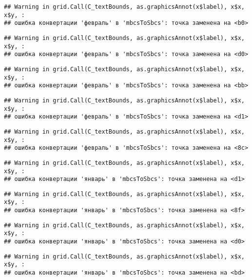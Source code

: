 \documentclass[
]{article}
\begin{document}
\begin{verbatim}
## Warning in grid.Call(C_textBounds, as.graphicsAnnot(x$label), x$x, x$y, :
## ошибка конвертации 'февраль' в 'mbcsToSbcs': точка заменена на <b0>
\end{verbatim}

\begin{verbatim}
## Warning in grid.Call(C_textBounds, as.graphicsAnnot(x$label), x$x, x$y, :
## ошибка конвертации 'февраль' в 'mbcsToSbcs': точка заменена на <d0>
\end{verbatim}

\begin{verbatim}
## Warning in grid.Call(C_textBounds, as.graphicsAnnot(x$label), x$x, x$y, :
## ошибка конвертации 'февраль' в 'mbcsToSbcs': точка заменена на <bb>
\end{verbatim}

\begin{verbatim}
## Warning in grid.Call(C_textBounds, as.graphicsAnnot(x$label), x$x, x$y, :
## ошибка конвертации 'февраль' в 'mbcsToSbcs': точка заменена на <d1>
\end{verbatim}

\begin{verbatim}
## Warning in grid.Call(C_textBounds, as.graphicsAnnot(x$label), x$x, x$y, :
## ошибка конвертации 'февраль' в 'mbcsToSbcs': точка заменена на <8c>
\end{verbatim}

\begin{verbatim}
## Warning in grid.Call(C_textBounds, as.graphicsAnnot(x$label), x$x, x$y, :
## ошибка конвертации 'январь' в 'mbcsToSbcs': точка заменена на <d1>
\end{verbatim}

\begin{verbatim}
## Warning in grid.Call(C_textBounds, as.graphicsAnnot(x$label), x$x, x$y, :
## ошибка конвертации 'январь' в 'mbcsToSbcs': точка заменена на <8f>
\end{verbatim}

\begin{verbatim}
## Warning in grid.Call(C_textBounds, as.graphicsAnnot(x$label), x$x, x$y, :
## ошибка конвертации 'январь' в 'mbcsToSbcs': точка заменена на <d0>
\end{verbatim}

\begin{verbatim}
## Warning in grid.Call(C_textBounds, as.graphicsAnnot(x$label), x$x, x$y, :
## ошибка конвертации 'январь' в 'mbcsToSbcs': точка заменена на <bd>
\end{verbatim}
\end{document}
